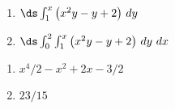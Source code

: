{\begin{enumerate}
	\item $\ds \int_1^x \big(x^2y - y+2\big)\ dy$\\
	\item $\ds \int_0^2\int_1^x \big(x^2y - y+2\big)\ dy\ dx$
\end{enumerate}
}
{\begin{enumerate}
	\item $x^4/2-x^2+2x-3/2$
	\item	$23/15$
\end{enumerate}
}
